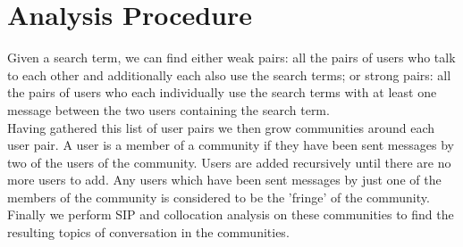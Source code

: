 \section{Analysis Procedure}
Given a search term, we can find either weak pairs: all the pairs of users who talk to each other and additionally each also use the search terms; or strong pairs: all the pairs of users who each individually use the search terms with at least one message between the two users containing the search term.\\
Having gathered this list of user pairs we then grow communities around each user pair.  A user is a member of a community if they have been sent messages by two of the users of the community. Users are added recursively until there are no more users to add.  Any users which have been sent messages by just one of the members of the community is considered to be the 'fringe' of the community.\\
Finally we perform SIP and collocation analysis on these communities to find the resulting topics of conversation in the communities.\\